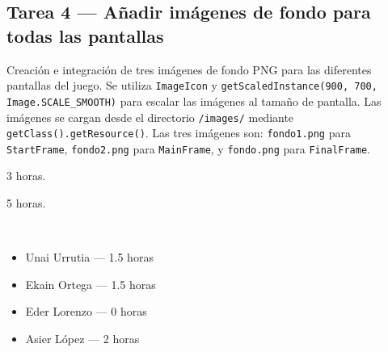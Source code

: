 \documentclass[12pt, a4paper]{article}
\begin{document}
\subsection*{Tarea 4 — Añadir imágenes de fondo para todas las pantallas}
\begin{description}[leftmargin=2em, style=nextline]
    \item[\textbf{Descripción:}] Creación e integración de tres imágenes de fondo PNG para las diferentes pantallas del juego. Se utiliza \texttt{ImageIcon} y \texttt{getScaledInstance(900, 700, Image.SCALE\_SMOOTH)} para escalar las imágenes al tamaño de pantalla. Las imágenes se cargan desde el directorio \texttt{/images/} mediante \texttt{getClass().getResource()}. Las tres imágenes son: \texttt{fondo1.png} para \texttt{StartFrame}, \texttt{fondo2.png} para \texttt{MainFrame}, y \texttt{fondo.png} para \texttt{FinalFrame}.
    \item[\textbf{Tiempo estimado:}] 3 horas.
    \item[\textbf{Tiempo real:}] 5 horas.
    \item[\textbf{Responsables y dedicación:}]~
        \begin{itemize}[leftmargin=1em, nosep]
            \item Unai Urrutia — 1.5 horas
            \item Ekain Ortega — 1.5 horas
            \item Eder Lorenzo — 0 horas
            \item Asier López — 2 horas
        \end{itemize}
\end{description}

\vspace{0.8em}

\end{document}
